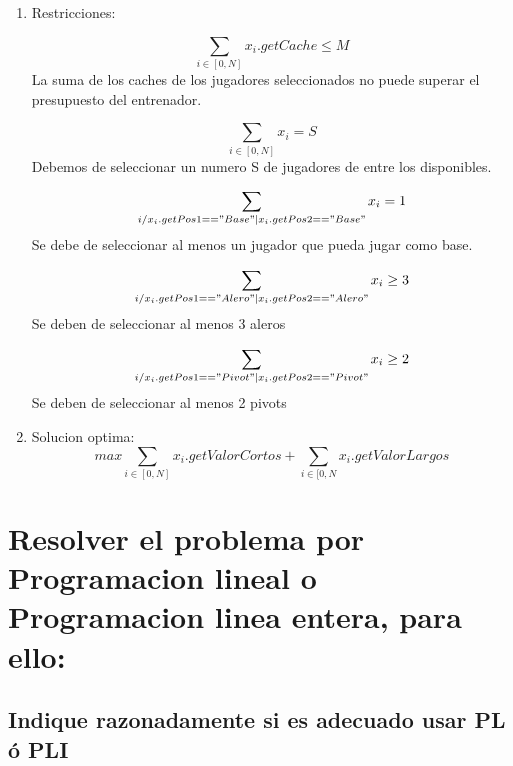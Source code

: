 \documentclass[a4paper,11pt]{article}
\begin{document}
\begin{enumerate}
 \item Restricciones:

 \begin{equation}
  \sum_{i \in [0,N]}{x_i .getCache} \leq M
 \end{equation}
 La suma de los caches de los jugadores seleccionados no puede superar el presupuesto del entrenador.

  \begin{equation}
  \sum_{i \in [0,N]}{x_i} = S
 \end{equation}
 Debemos de seleccionar un numero S de jugadores de entre los disponibles.

 \begin{equation}
  \sum_{i / x_i.getPos1=="Base" | x_i.getPos2=="Base"}{x_i} = 1
 \end{equation}
 Se debe de seleccionar al menos un jugador que pueda jugar como base.

\begin{equation}
  \sum_{i / x_i.getPos1=="Alero" | x_i.getPos2=="Alero"}{x_i} \geq 3
 \end{equation}
 Se deben de seleccionar al menos 3 aleros

\begin{equation}
  \sum_{i / x_i.getPos1=="Pivot" | x_i.getPos2=="Pivot"}{x_i} \geq 2
 \end{equation}
 Se deben de seleccionar al menos 2 pivots\\


 \item Solucion optima:\\

\begin{equation*}
max  \sum_{i \in [0,N]}{x_i.getValorCortos}+\sum_{i \in [0,N}{x_i.getValorLargos}
\end{equation*}


\end{enumerate}



\section{Resolver el problema por Programacion lineal o Programacion linea entera, para ello:}

\subsection{Indique razonadamente si es adecuado usar PL ó PLI}
\end{document}
